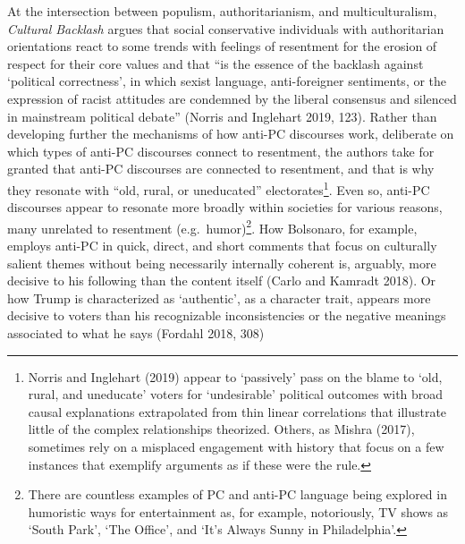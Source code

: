 \documentclass[
  12pt,
]{article}
\begin{document}
At the intersection between populism, authoritarianism, and
multiculturalism, \emph{Cultural Backlash} argues that social
conservative individuals with authoritarian orientations react to some
trends with feelings of resentment for the erosion of respect for their
core values and that ``is the essence of the backlash against `political
correctness', in which sexist language, anti-foreigner sentiments, or
the expression of racist attitudes are condemned by the liberal
consensus and silenced in mainstream political debate'' (Norris and
Inglehart 2019, 123). Rather than developing further the mechanisms of
how anti-PC discourses work, deliberate on which types of anti-PC
discourses connect to resentment, the authors take for granted that
anti-PC discourses are connected to resentment, and that is why they
resonate with ``old, rural, or uneducated'' electorates\footnote{ Norris
  and Inglehart (2019) appear to `passively' pass on the blame to `old,
  rural, and uneducate' voters for `undesirable' political outcomes with
  broad causal explanations extrapolated from thin linear correlations
  that illustrate little of the complex relationships theorized. Others,
  as Mishra (2017), sometimes rely on a misplaced engagement with
  history that focus on a few instances that exemplify arguments as if
  these were the rule.}. Even so, anti-PC discourses appear to resonate
more broadly within societies for various reasons, many unrelated to
resentment (e.g.~humor)\footnote{ There are countless examples of PC and
  anti-PC language being explored in humoristic ways for entertainment
  as, for example, notoriously, TV shows as `South Park', `The Office',
  and `It's Always Sunny in Philadelphia'.}. How Bolsonaro, for example,
employs anti-PC in quick, direct, and short comments that focus on
culturally salient themes without being necessarily internally coherent
is, arguably, more decisive to his following than the content itself
(Carlo and Kamradt 2018). Or how Trump is characterized as `authentic',
as a character trait, appears more decisive to voters than his
recognizable inconsistencies or the negative meanings associated to what
he says (Fordahl 2018, 308)
\end{document}
